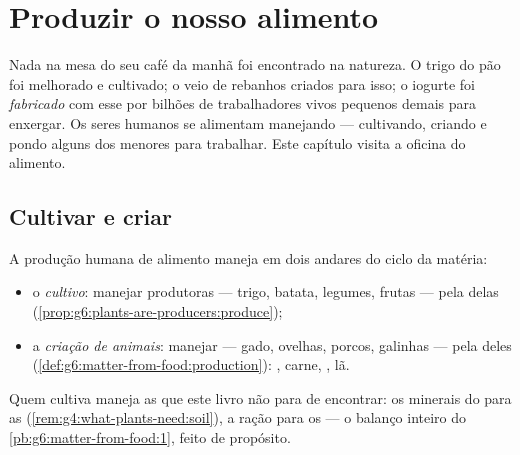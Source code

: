 \chapter{Produzir o nosso alimento}\label{ch:g6:producing-our-food}

Nada na mesa do seu café da manhã foi encontrado na natureza. O trigo
do pão foi melhorado e cultivado; o  veio de rebanhos criados
para isso; o iogurte foi \emph{fabricado} com esse  por bilhões
de trabalhadores vivos pequenos demais para enxergar. Os seres humanos
se alimentam manejando  --- cultivando, criando e pondo
alguns dos menores para trabalhar. Este capítulo visita a oficina do
alimento.

\section{Cultivar e criar}

\begin{definition}\label{def:g6:producing-our-food:farming}
A produção humana de alimento maneja  em dois andares do
ciclo da matéria:
\begin{itemize}
  \item o \emph{cultivo}: manejar produtoras --- trigo,
        batata, legumes, frutas --- pela  delas
        (\cref{prop:g6:plants-are-producers:produce});
  \item a \emph{criação de animais}:
        manejar  --- gado, ovelhas, porcos, galinhas ---
        pela  deles
        (\cref{def:g6:matter-from-food:production}): , carne,
        , lã.
\end{itemize}
Quem cultiva maneja as  que este livro não para de
encontrar: os minerais do  para as 
(\cref{rem:g4:what-plants-need:soil}), a ração para os  --- o
balanço inteiro do \cref{pb:g6:matter-from-food:1}, feito de propósito.
\end{definition}

